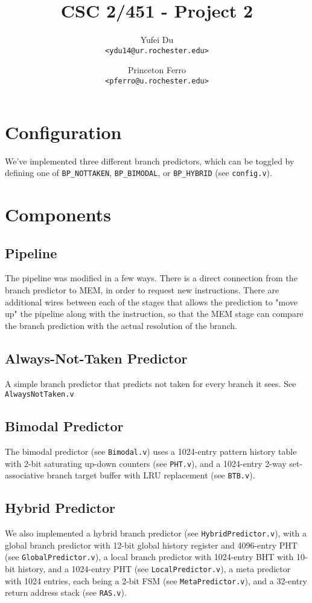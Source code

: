 \documentclass[a4paper,11pt]{article}
\title{CSC 2/451 - Project 2}
\author{
Yufei Du \\
\texttt{<ydu14@ur.rochester.edu>}
\and
Princeton Ferro \\
\texttt{<pferro@u.rochester.edu>}
}
\begin{document}
\maketitle

\section{Configuration}
We've implemented three different branch predictors, which can be toggled by defining one of \texttt{BP\_NOTTAKEN}, \texttt{BP\_BIMODAL}, or \texttt{BP\_HYBRID} (see \texttt{config.v}).

\section{Components}
\subsection{Pipeline}
The pipeline was modified in a few ways. There is a direct connection from the branch predictor to MEM, in order to request new instructions. There are additional wires between each of the stages that allows the prediction to "move up" the pipeline along with the instruction, so that the MEM stage can compare the branch prediction with the actual resolution of the branch.

\subsection{Always-Not-Taken Predictor}
A simple branch predictor that predicts not taken for every branch it sees. See \texttt{AlwaysNotTaken.v}

\subsection{Bimodal Predictor}
The bimodal predictor (see \texttt{Bimodal.v}) uses a 1024-entry pattern history table with 2-bit saturating up-down counters (see \texttt{PHT.v}), and a 1024-entry 2-way set-associative branch target buffer with LRU replacement (see \texttt{BTB.v}).

\subsection{Hybrid Predictor}
We also implemented a hybrid branch predictor (see \texttt{HybridPredictor.v}), with a global branch predictor with 12-bit global history register and 4096-entry PHT (see \texttt{GlobalPredictor.v}), a local branch predictor with 1024-entry BHT with 10-bit history, and a 1024-entry PHT (see \texttt{LocalPredictor.v}), a meta predictor with 1024 entries, each being a 2-bit FSM (see \texttt{MetaPredictor.v}), and a 32-entry return address stack (see \texttt{RAS.v}).
\end{document}
